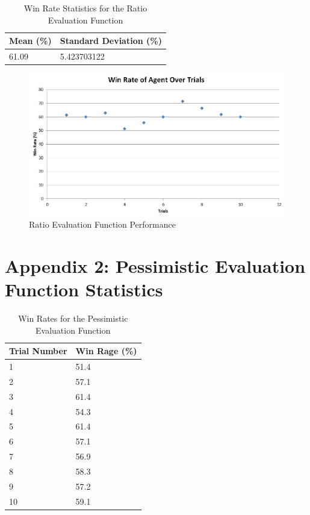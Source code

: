 \documentclass[12pt]{article}
\begin{document}
\begin{table}[h]
\centering
\caption{Win Rate Statistics for the Ratio Evaluation Function}
\label{ratio-stats}
\begin{tabular}{@{}|l|l|@{}}
\toprule
Mean (\%)& Standard Deviation (\%) \\ \midrule
61.09           & 5.423703122
\\ \bottomrule
\end{tabular}
\end{table}

\begin{figure}[h]
\centering
\caption{Ratio Evaluation Function Performance}
\includegraphics[scale=0.71]{ratio-evaluation-function-results.JPG}
\end{figure}

\clearpage
\section{Appendix 2: Pessimistic Evaluation Function Statistics}
\begin{table}[h]
\centering
\caption{Win Rates for the Pessimistic Evaluation Function}
\label{pessimistic-label}
\begin{tabular}{@{}|l|l|@{}}
\toprule
Trial Number & Win Rage (\%) \\ \midrule
1            & 51.4          \\ \midrule
2            & 57.1          \\ \midrule
3            & 61.4          \\ \midrule
4            & 54.3          \\ \midrule
5            & 61.4          \\ \midrule
6            & 57.1          \\ \midrule
7            & 56.9          \\ \midrule
8            & 58.3          \\ \midrule
9            & 57.2          \\ \midrule
10           & 59.1          \\ \bottomrule
\end{tabular}
\end{table}
\end{document}
